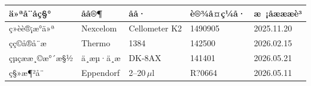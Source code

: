 \documentclass[UTF8,10pt,a4paper,fontset=fandol]{ctexart}
\newcommand{\fieldvalue}[1]{#1}
\newcommand{\handwritten}[1]{#1}
\begin{document}
\begin{center}
\begin{center}
\noindent
\small
\begin{tabularx}{\textwidth}{|p{2.2cm}|p{2.2cm}|p{2.3cm}|p{2.6cm}|X|}
\hline
ä»ªå¨åç§° & åå®¶ & åå· & è®¾å¤ç¼å· & æ ¡åæææè³\\
\hline
\fieldvalue{ç»èè®¡æ°ä»ª} &
\fieldvalue{Nexcelom} &
\fieldvalue{Cellometer K2} &
\fieldvalue{\handwritten{1490905}} &
\fieldvalue{\handwritten{2025.11.20}}\\
\hline
\fieldvalue{çç©å®å¨æ} &
\fieldvalue{Thermo} &
\fieldvalue{1384} &
\fieldvalue{\handwritten{142500}} &
\fieldvalue{\handwritten{2026.02.15}}\\
\hline
\fieldvalue{çµç­ææ¸©æ°´æ§½} &
\fieldvalue{ä¸æµ·ä¸æ} &
\fieldvalue{\handwritten{DK-8AX}} &
\fieldvalue{\handwritten{141401}} &
\fieldvalue{\handwritten{2026.05.21}}\\
\hline
\fieldvalue{ç§»æ¶²å¨} &
\fieldvalue{Eppendorf} &
\fieldvalue{\handwritten{2--20\,\(\mu\)l}} &
\fieldvalue{\handwritten{R?0664}} &
\fieldvalue{\handwritten{2026.05.11}}\\
\hline
\end{tabularx}
\normalsize


\end{center}
\end{center}
\end{document}
